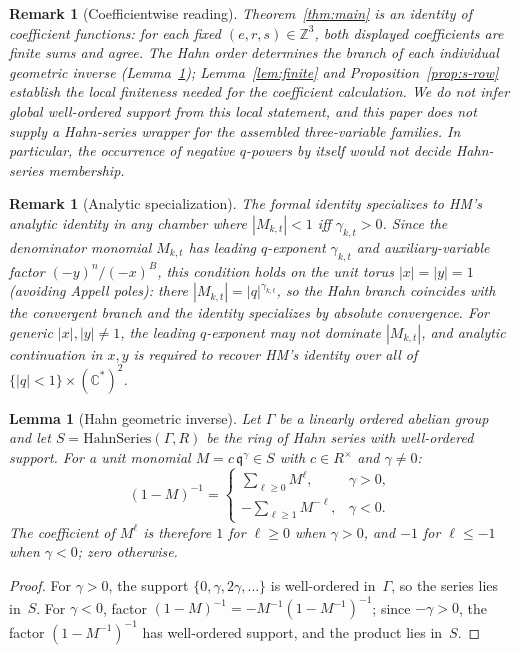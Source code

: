 \documentclass[11pt]{article}
\newtheorem{lemma}[theorem]{Lemma}
\newtheorem{remark}[theorem]{Remark}
\newcommand{\Z}{\mathbb{Z}}
\begin{document}
\begin{remark}[Coefficientwise reading]\label{rem:coeff}
Theorem~\ref{thm:main} is an identity of coefficient functions: for each
fixed $(e,r,s)\in\Z^3$, both displayed coefficients are finite sums and
agree.  The Hahn order determines the branch of each individual geometric
inverse (Lemma~\ref{lem:hahn}); Lemma~\ref{lem:finite} and
Proposition~\ref{prop:s-row} establish the local finiteness needed for the
coefficient calculation.  We do not infer global well-ordered support from
this local statement, and this paper does not supply a Hahn-series wrapper
for the assembled three-variable families.  In particular, the occurrence
of negative $q$-powers by itself would not decide Hahn-series membership.
\end{remark}

\begin{remark}[Analytic specialization]\label{rem:analytic}
The formal identity specializes to HM's analytic identity
in any chamber where $|M_{k,t}|<1$ iff $\gamma_{k,t}>0$.
Since the denominator monomial $M_{k,t}$ has leading $q$-exponent
$\gamma_{k,t}$ and auxiliary-variable factor $(-y)^n/(-x)^B$,
this condition holds on the unit torus $|x|=|y|=1$
(avoiding Appell poles): there $|M_{k,t}|=|q|^{\gamma_{k,t}}$,
so the Hahn branch coincides with the convergent branch and
the identity specializes by absolute convergence.  For
generic $|x|,|y|\neq 1$, the leading $q$-exponent may not
dominate $|M_{k,t}|$, and analytic continuation in $x,y$
is required to recover HM's identity over all of
$\{|q|<1\}\times(\mathbb{C}^*)^2$.
\end{remark}

\begin{lemma}[Hahn geometric inverse]\label{lem:hahn}
Let $\Gamma$ be a linearly ordered abelian group and let
$S=\mathrm{HahnSeries}(\Gamma,R)$ be the ring of Hahn series
with well-ordered support.  For a unit
monomial $M=c\,\mathfrak{q}^\gamma\in S$ with $c\in R^\times$
and $\gamma\neq 0$:
\[
  (1-M)^{-1}=
  \begin{cases}
    \displaystyle\sum_{\ell\ge 0}M^\ell, & \gamma>0,\\[6pt]
    \displaystyle-\sum_{\ell\ge 1}M^{-\ell}, & \gamma<0.
  \end{cases}
\]
The coefficient of $M^\ell$ is therefore $1$ for $\ell\ge 0$ when
$\gamma>0$, and $-1$ for $\ell\le -1$ when $\gamma<0$;
zero otherwise.
\end{lemma}

\begin{proof}
For $\gamma>0$, the support $\{0,\gamma,2\gamma,\ldots\}$ is
well-ordered in~$\Gamma$, so the series lies in~$S$.
For $\gamma<0$, factor $(1-M)^{-1}=-M^{-1}(1-M^{-1})^{-1}$;
since $-\gamma>0$, the factor $(1-M^{-1})^{-1}$ has well-ordered
support, and the product lies in~$S$.
\end{proof}
\end{document}
